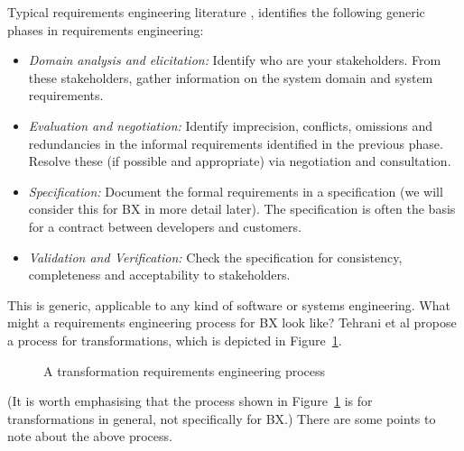 Typical requirements engineering literature \cite{ieee-29148-2011}, identifies the following generic phases in requirements engineering:
\begin{itemize}
\item \textit{Domain analysis and elicitation:} Identify who are your stakeholders. From these stakeholders, gather information on the system domain and system requirements.

\item \textit{Evaluation and negotiation:} Identify imprecision, conflicts, omissions and redundancies in the informal requirements identified in the previous phase.  Resolve these (if possible and appropriate) via negotiation and consultation.

\item \textit{Specification:} Document the formal requirements in a specification (we will consider this for BX in more detail later). The specification is often the basis for a contract between developers and customers.

\item \textit{Validation and Verification:} Check the specification for consistency, completeness and acceptability to stakeholders.
\end{itemize}

This is generic, applicable to any kind of software or systems engineering. What might a requirements engineering process for BX look like? Tehrani et al \cite{TehraniZL16} propose a process for transformations, which is depicted in Figure~\ref{fig:re-process}.

\begin{figure}[htbp]
\caption{A transformation requirements engineering process \cite{TehraniZL16}}
\label{fig:re-process}
\end{figure}
(It is worth emphasising that the process shown in Figure~\ref{fig:re-process} is for transformations in general, not specifically for BX.) There are some points to note about the above process.

